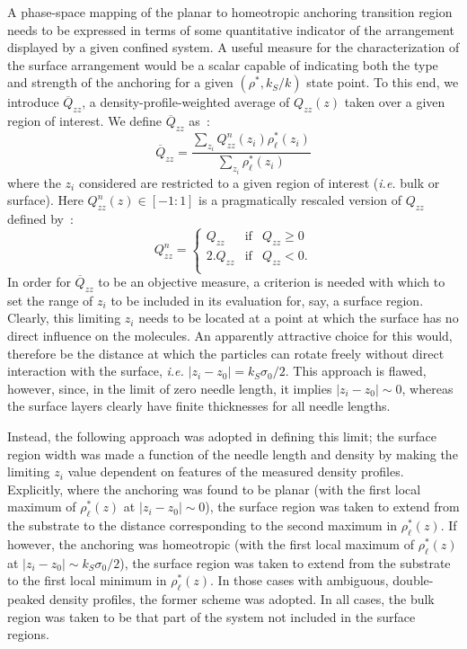 \documentclass[aps,10pt,twocolumn]{revtex4}
\newcommand{\so}{\sigma_0}
\begin{document}
A phase-space mapping of the planar to homeotropic anchoring transition region needs to be expressed in terms of
some quantitative indicator of the arrangement displayed by a given confined system. A useful measure for the
characterization of the surface arrangement would be a scalar capable of indicating both the type and strength of
the anchoring for a given $(\rho^{*}, k_S/k)$ state point. To this end, we introduce $\overline{Q}_{zz}$, a
density-profile-weighted average of $Q_{zz}(z)$ taken over a given region of interest. We define
$\overline{Q}_{zz}$ as~:
\begin{equation}
    \overline{Q}_{zz} = \frac{\sum_{z_i} Q^{n}_{zz}(z_i) \rho^{*}_\ell(z_i)}
            {\sum_{z_i} \rho^{*}_\ell(z_i)}
\end{equation}
where the $z_i$ considered are restricted to a given region of interest ({\em i.e.} bulk or surface). Here
$Q^{n}_{zz}(z)\in[-1:1]$ is a pragmatically rescaled version of $Q_{zz}$ defined by~:
\begin{equation}
    Q^{n}_{zz} = \left\{    %
    \begin{array}{ccc}
        Q_{zz}      &\text{if}  &Q_{zz} \geq 0  \\
        2.Q_{zz}    &\text{if}  &Q_{zz} < 0.\\
    \end{array}
    \right.
\end{equation}
In order for $\overline{Q}_{zz}$ to be an objective measure, a criterion is needed with which to set the range of
$z_i$ to be included in its evaluation for, say, a surface region. Clearly, this limiting $z_i$ needs to be
located at a point at which the surface has no direct influence on the molecules. An apparently attractive choice
for this would, therefore be the distance at which the particles can rotate freely without direct interaction with
the surface, {\em i.e.} $|z_i-z_0| = k_S \so/2$. This approach is flawed, however, since, in the limit of zero
needle length, it implies $|z_i-z_0| \sim 0$, whereas the surface layers clearly have finite thicknesses for all
needle lengths.

Instead, the following approach was adopted in defining this limit; the surface region width was made a function
of the needle length and density by making the limiting $z_i$ value dependent on features of the measured density
profiles. Explicitly, where the anchoring was found to be planar (with the first local maximum of
$\rho^{*}_\ell(z)$ at $|z_i-z_0|\sim 0$), the surface region was taken to extend from the substrate to the
distance corresponding to the second maximum in $\rho^{*}_\ell(z)$. If however, the anchoring was homeotropic
(with the first local maximum of $\rho^{*}_\ell(z)$ at $|z_i-z_0|\sim k_S \so/2$), the surface region was taken to
extend from the substrate to the first local minimum in $\rho^{*}_\ell(z)$. In those cases with ambiguous,
double-peaked density profiles, the former scheme was adopted. In all cases, the bulk region was taken to be that
part of the system not included in the surface regions.
\end{document}
